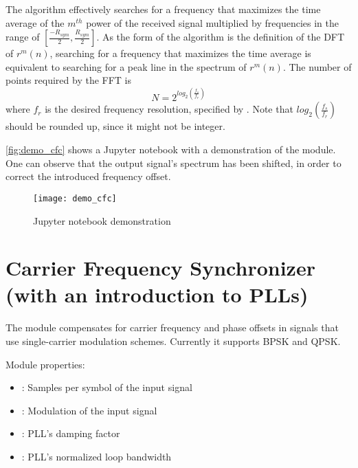 The algorithm effectively searches for a frequency that maximizes the time average of the $m^{th}$ power of the received signal multiplied by frequencies in the range of $\left[\frac{-R_{sym}}{2}, \frac{R_{sym}}{2}\right]$. As the form of the algorithm is the definition of the DFT of $r^{m}(n)$, searching for a frequency that maximizes the time average is equivalent to searching for a peak line in the spectrum of $r^{m}(n)$. The number of points required by the FFT is
\begin{equation}
  N=2^{log_2\left(\frac{f_s}{f_r}\right)}
\end{equation}
where $f_r$ is the desired frequency resolution, specified by . Note that $log_2\left(\frac{f_s}{f_r}\right)$ should be rounded up, since it might not be integer.

\autoref{fig:demo_cfc} shows a Jupyter notebook with a demonstration of the  module. One can observe that the output signal's spectrum has been shifted, in order to correct the introduced frequency offset.

\begin{figure}[H]
  \centering
  \texttt{[image: demo\_cfc]}
  \caption{ Jupyter notebook demonstration}
  \label{fig:demo_cfc}
\end{figure}

\section{Carrier Frequency Synchronizer (with an introduction to PLLs)}
\label{sect:library_freq_sync}

The  module compensates for carrier frequency and phase offsets in signals that use single-carrier modulation schemes. Currently it supports BPSK and QPSK.

\noindent Module properties:
\begin{itemize}
  \item {}: Samples per symbol of the input signal
  \item {}: Modulation of the input signal
  \item {}: PLL's damping factor
  \item {}: PLL's normalized loop bandwidth
\end{itemize}

